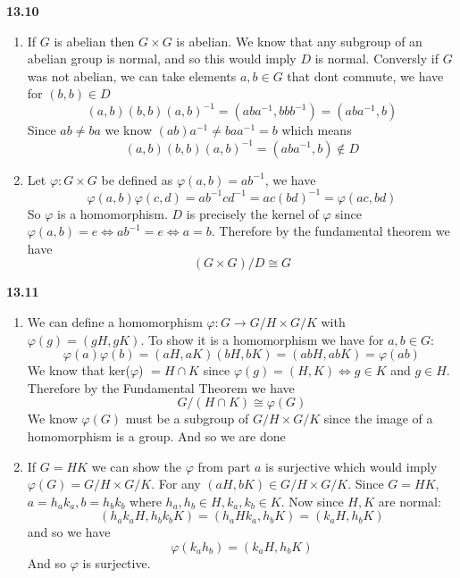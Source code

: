 \documentclass[12pt]{article}
\newenvironment{ques}{\vspace{2 ex}}{\vspace{2 ex}}
\theoremstyle{definition}
\begin{document}
\begin{ques}
	\textbf{13.10}
		\begin{enumerate}
			\item
				If $G$ is abelian then $G \times G$ is abelian.
				We know that any subgroup of an abelian group
				is normal, and so this would imply $D$ is
				normal. Conversly if $G$ was not abelian, we
				can take elements $a, b \in G$ that dont
				commute, we have for $(b, b) \in D$
				$$(a, b) (b, b) (a, b)^{-1} = (aba^{-1},
				bbb^{-1}) = (aba^{-1}, b)$$
				Since $ab \neq ba$ we know $(ab)a^{-1} \neq
				baa^{-1} = b$ which means
				$$(a, b) (b, b) (a, b)^{-1} = (aba^{-1}, b)
				\notin D$$
			\item 
				Let $\varphi: G \times G$ be defined as
				$\varphi(a, b) = ab^{-1}$, we have 
				$$\varphi(a,b)\varphi(c,d) = ab^{-1}cd^{-1} =
				ac(bd)^{-1} = \varphi(ac,bd)$$
				So $\varphi$ is a homomorphism. $D$ is
				precisely the kernel of $\varphi$ since
				$\varphi(a,b) = e \Leftrightarrow ab^{-1} = e
				\Leftrightarrow a = b$. Therefore by the
				fundamental theorem we have 
				$$(G\times G)/D \cong G$$
		\end{enumerate}
\end{ques}

\begin{ques}
	\textbf{13.11}
		\begin{enumerate}
			\item
				We can define a homomorphism $\varphi: G \to
				G/H \times G/K$ with $\varphi(g) = (gH, gK)$.
				To show it is a homomorphism we have for $a,b
				\in G$:
				$$\varphi(a)\varphi(b) = (aH, aK)(bH, bK) =
				(abH, abK) = \varphi(ab)$$
				We know that ker($\varphi$) $= H \cap K$ since
				$\varphi(g) = (H, K) \Leftrightarrow g \in K$
				and $g \in H$. Therefore by the Fundamental Theorem we have
				$$G/(H \cap K) \cong \varphi(G)$$
				We know $\varphi(G)$ must be a subgroup of $G/H
				\times G/K$ since the image of a homomorphism
				is a group. And so we are done
			\item 
				If $G = HK$ we can show the $\varphi$ from part
				$a$ is surjective which would imply
				$\varphi(G)= G/H \times G/K$. For any $(aH,bK) \in G/H
				\times G/K$. Since $G = HK$, $a = h_ak_a,
				b=h_bk_b$ where $h_a,h_b \in H, k_a, k_b \in K$. 
				Now since $H,K$ are normal:
				$$(h_ak_aH, h_bk_bK) = (h_aHk_a, h_bK) = (k_aH, h_bK)$$
				and so we have
				$$\varphi(k_ah_b) = (k_aH, h_bK)$$
				And so $\varphi$ is surjective.
		\end{enumerate}
\end{ques}
\end{document}

